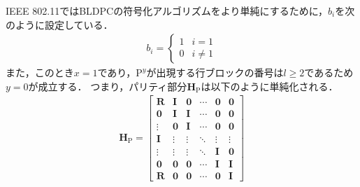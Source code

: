 \documentclass[twocolumn, a4paper]{ieicejsp}
\begin{document}
IEEE 802.11ではBLDPCの符号化アルゴリズムをより単純にするために，$b_i$を次のように設定している．
\begin{align}
  b_i = \begin{cases}
    1 & i = 1 \\
    0 & i \not=1
  \end{cases}
\end{align}
また，このとき$x=1$であり，$\mathrm{P}^y$が出現する行ブロックの番号は$l \geq 2$であるため$y=0$が成立する．
つまり，パリティ部分$\mathbf{H}_\mathrm{P}$は以下のように単純化される．
\begin{align}
  \mathbf{H}_{\mathrm{P}} = \begin{bmatrix}
    \mathbf{R} & \mathbf{I} & \mathbf{0} & \cdots & \mathbf{0} & \mathbf{0} \\
    \mathbf{0} & \mathbf{I} & \mathbf{I} & \cdots & \mathbf{0} & \mathbf{0} \\
    \vdots & \mathbf{0} & \mathbf{I} & \cdots & \mathbf{0} & \mathbf{0} \\
    \mathbf{I} & \vdots & \vdots & \ddots & \vdots & \vdots \\
    \vdots & \vdots & \vdots & \ddots & \mathbf{I} & \mathbf{0} \\
    \mathbf{0} & \mathbf{0} & \mathbf{0} & \cdots & \mathbf{I} & \mathbf{I} \\
    \mathbf{R} & \mathbf{0} & \mathbf{0} & \cdots & \mathbf{0} & \mathbf{I}
  \end{bmatrix}
\end{align}
\end{document}

